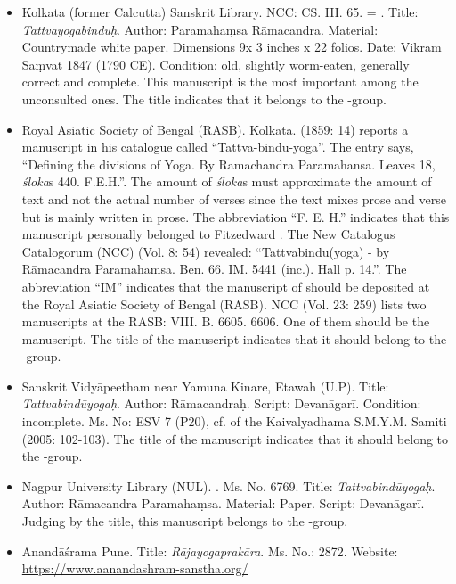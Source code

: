 \begin{itemize}
\item Kolkata (former Calcutta) Sanskrit Library. NCC: CS. III. 65. = . Title: \emph{Tattvayogabinduḥ}. Author: Paramahaṃsa Rāmacandra. Material: Countrymade white paper. Dimensions 9x 3 inches x 22 folios. Date: Vikram Saṃvat 1847 (1790 CE). Condition: old, slightly worm-eaten, generally correct and complete. This manuscript is the most important among the unconsulted ones. The title indicates that it belongs to the \alpha-group. 
\item Royal Asiatic Society of Bengal (RASB). Kolkata. \nocite{newcataloguscatalogorum8} \nocite{newcataloguscatalogorum23} \citeauthor{hall1859} (1859: 14) reports a manuscript  in his catalogue called ``Tattva-bindu-yoga''. The entry says, ``Defining the divisions of Yoga. By Ramachandra Paramahansa. Leaves 18, \textit{śloka}s 440. F.E.H.''. The amount of \textit{śloka}s must approximate the amount of text and not the actual number of verses since the text mixes prose and verse but is mainly written in prose. The abbreviation ``F. E. H.'' indicates that this manuscript personally belonged to Fitzedward \citeauthor{hall1859}. The New Catalogus Catalogorum (NCC) (Vol. 8: 54) revealed: ``Tattvabindu(yoga) - by Rāmacandra Paramahamsa. Ben. 66. IM. 5441 (inc.). Hall p. 14.''. The abbreviation ``IM'' indicates that the manuscript of \citeauthor{hall1859} should be deposited at the Royal Asiatic Society of Bengal (RASB). NCC (Vol. 23: 259) lists two manuscripts at the RASB: VIII. B. 6605. 6606. One of them should be the \citeauthor{hall1859} manuscript. The title of the manuscript indicates that it should belong to the \beta-group. 
\item Sanskrit Vidyāpeetham near Yamuna Kinare, Etawah (U.P). Title: \textit{Tattvabindūyogaḥ}. Author: Rāmacandraḥ. Script: Devanāgarī. Condition: incomplete. Ms. No: ESV 7 (P20), cf.  of the Kaivalyadhama S.M.Y.M. Samiti (2005: 102-103). The title of the manuscript indicates that it should belong to the \beta-group. 
\item  Nagpur University Library (NUL). . Ms. No. 6769. Title: \emph{Tattvabindūyogaḥ}. Author: Rāmacandra Paramahaṃsa. Material: Paper. Script: Devanāgarī. Judging by the title, this manuscript belongs to the \beta-group. 
\item Ānandāśrama Pune. Title: \emph{Rājayogaprakāra}. Ms. No.: 2872. Website: \url{https://www.aanandashram-sanstha.org/}

\end{itemize}
